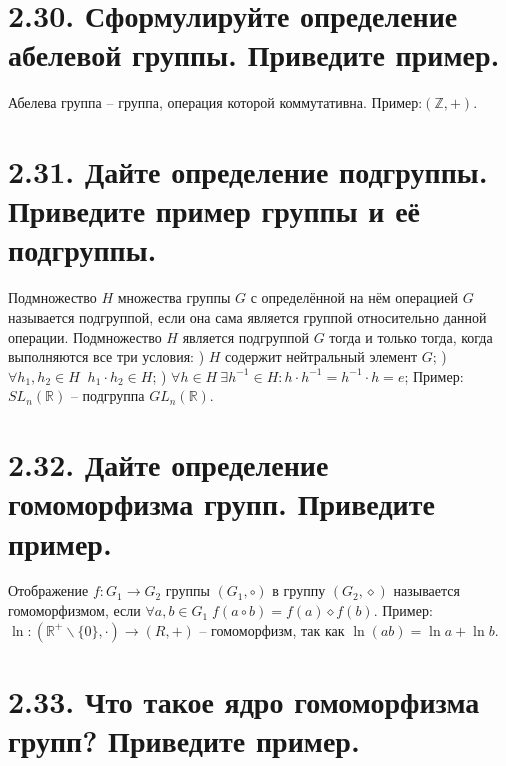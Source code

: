 \documentclass{article}
\begin{document}
\section*{\LARGE 2.30. Сформулируйте определение абелевой группы. Приведите пример. }

Абелева группа -- группа, операция которой коммутативна. Пример:$(\mathbb{Z}, +)$.

\section*{\LARGE 2.31. Дайте определение подгруппы. Приведите пример группы и её подгруппы.  }

Подмножество $H$ множества группы $G$ с определённой на нём операцией $G$ называется подгруппой, если она сама является группой относительно данной операции. 
\newline Подмножество $H$ является подгруппой $G$ тогда и только тогда, когда выполняются все три условия:
) $H$ содержит нейтральный элемент $G$;
) $\forall h_1, h_2 \in H \;\; h_1 \cdot h_2 \in H$;
) $\forall h \in H \: \exists h^{-1} \in H : h \cdot h^{-1} = h^{-1} \cdot h = e$;
\newline Пример: $SL_n(\mathbb{R})$ -- подгруппа $GL_n(\mathbb{R})$.

\section*{\LARGE 2.32. Дайте определение гомоморфизма групп. Приведите пример.  }

Отображение $f : G_1 \rightarrow G_2$ группы $(G_1, \circ)$ в группу $(G_2, \diamond)$ называется гомоморфизмом, если $\forall a, b \in G_1 \; f(a \circ b) = f(a) \diamond f(b)$. 
\newline Пример: $\ln : (\mathbb{R}^+ \backslash \{0\}, \cdot) \rightarrow (R, +)$ -- гомоморфизм, так как $\ln{(ab)} = \ln{a} + \ln{b}$.

\section*{\LARGE 2.33. Что такое ядро гомоморфизма групп? Приведите пример.  }
\end{document}
